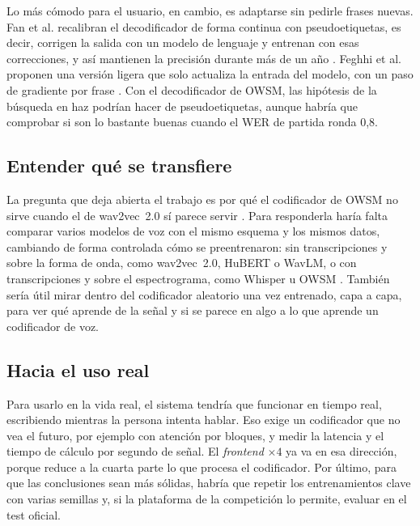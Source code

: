 Lo más cómodo para el usuario, en cambio, es adaptarse sin pedirle frases nuevas. Fan et al. recalibran el decodificador de forma continua con pseudoetiquetas, es decir, corrigen la salida con un modelo de lenguaje y entrenan con esas correcciones, y así mantienen la precisión durante más de un año \cite{fan2023corp}. Feghhi et al. proponen una versión ligera que solo actualiza la entrada del modelo, con un paso de gradiente por frase \cite{feghhi2025timemasked}. Con el decodificador de OWSM, las hipótesis de la búsqueda en haz podrían hacer de pseudoetiquetas, aunque habría que comprobar si son lo bastante buenas cuando el WER de partida ronda 0,8.

\subsection{Entender qué se transfiere}

La pregunta que deja abierta el trabajo es por qué el codificador de OWSM no sirve cuando el de wav2vec~2.0 sí parece servir \cite{fiedler2025wav2vec2brain}. Para responderla haría falta comparar varios modelos de voz con el mismo esquema y los mismos datos, cambiando de forma controlada cómo se preentrenaron: sin transcripciones y sobre la forma de onda, como wav2vec~2.0, HuBERT o WavLM, o con transcripciones y sobre el espectrograma, como Whisper u OWSM \cite{baevski2020wav2vec,hsu2021hubert,chen2022wavlm,radford2023whisper}. También sería útil mirar dentro del codificador aleatorio una vez entrenado, capa a capa, para ver qué aprende de la señal y si se parece en algo a lo que aprende un codificador de voz.

\subsection{Hacia el uso real}

Para usarlo en la vida real, el sistema tendría que funcionar en tiempo real, escribiendo mientras la persona intenta hablar. Eso exige un codificador que no vea el futuro, por ejemplo con atención por bloques, y medir la latencia y el tiempo de cálculo por segundo de señal. El \textit{frontend} $\times 4$ ya va en esa dirección, porque reduce a la cuarta parte lo que procesa el codificador. Por último, para que las conclusiones sean más sólidas, habría que repetir los entrenamientos clave con varias semillas y, si la plataforma de la competición lo permite, evaluar en el test oficial.
